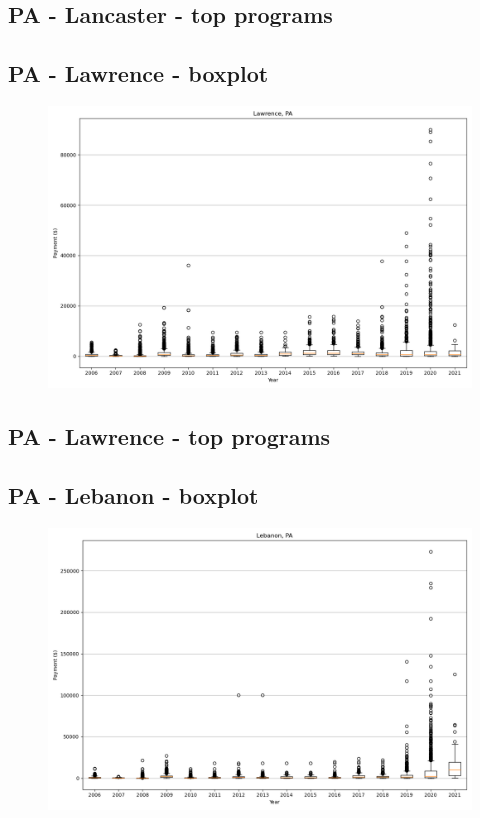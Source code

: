 \subsection*{PA - Lancaster - top programs}

\newpage
\subsection*{PA - Lawrence - boxplot}
\begin{figure}[h]
\centering
\includegraphics[width=7in]{../output/boxplots/counties/Lawrence-PA_boxplot.png}
\end{figure}


\subsection*{PA - Lawrence - top programs}

\newpage
\subsection*{PA - Lebanon - boxplot}
\begin{figure}[h]
\centering
\includegraphics[width=7in]{../output/boxplots/counties/Lebanon-PA_boxplot.png}
\end{figure}


